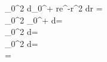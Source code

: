 \int_0^{2\pi} d\theta \int_0^{+\infty} re^{-r^2} dr =\\

\int_0^{2\pi}
_0^{+\infty}
d\theta =\\

\int_0^{2\pi}
 d\theta =\\

 \int_0^{2\pi}
d\theta =\\

 =\\
\pi